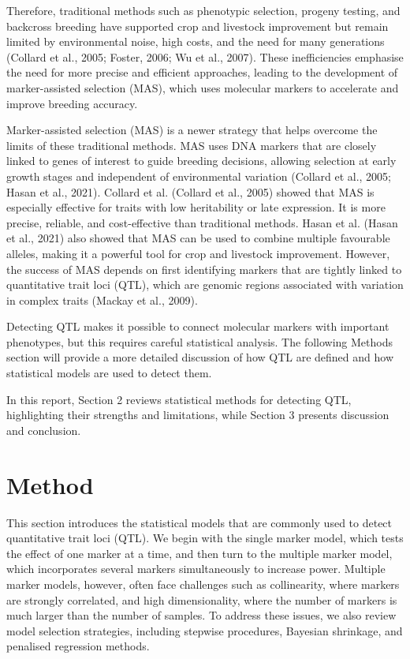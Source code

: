 \documentclass[
  letterpaper,
  DIV=11,
  numbers=noendperiod]{scrartcl}
\begin{document}
Therefore, traditional methods such as phenotypic selection, progeny
testing, and backcross breeding have supported crop and livestock
improvement but remain limited by environmental noise, high costs, and
the need for many generations (Collard et al., 2005; Foster, 2006; Wu et
al., 2007). These inefficiencies emphasise the need for more precise and
efficient approaches, leading to the development of marker-assisted
selection (MAS), which uses molecular markers to accelerate and improve
breeding accuracy.

Marker-assisted selection (MAS) is a newer strategy that helps overcome
the limits of these traditional methods. MAS uses DNA markers that are
closely linked to genes of interest to guide breeding decisions,
allowing selection at early growth stages and independent of
environmental variation (Collard et al., 2005; Hasan et al., 2021).
Collard et al. (Collard et al., 2005) showed that MAS is especially
effective for traits with low heritability or late expression. It is
more precise, reliable, and cost-effective than traditional methods.
Hasan et al. (Hasan et al., 2021) also showed that MAS can be used to
combine multiple favourable alleles, making it a powerful tool for crop
and livestock improvement. However, the success of MAS depends on first
identifying markers that are tightly linked to quantitative trait loci
(QTL), which are genomic regions associated with variation in complex
traits (Mackay et al., 2009).

Detecting QTL makes it possible to connect molecular markers with
important phenotypes, but this requires careful statistical analysis.
The following Methods section will provide a more detailed discussion of
how QTL are defined and how statistical models are used to detect them.

In this report, Section 2 reviews statistical methods for detecting QTL,
highlighting their strengths and limitations, while Section 3 presents
discussion and conclusion.

\section{Method}\label{method}

This section introduces the statistical models that are commonly used to
detect quantitative trait loci (QTL). We begin with the single marker
model, which tests the effect of one marker at a time, and then turn to
the multiple marker model, which incorporates several markers
simultaneously to increase power. Multiple marker models, however, often
face challenges such as collinearity, where markers are strongly
correlated, and high dimensionality, where the number of markers is much
larger than the number of samples. To address these issues, we also
review model selection strategies, including stepwise procedures,
Bayesian shrinkage, and penalised regression methods.
\end{document}
